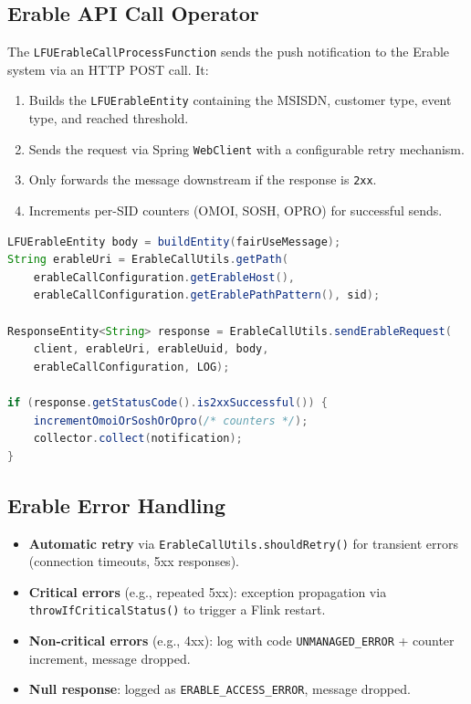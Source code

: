 \subsection{Erable API Call Operator}

The \texttt{LFUErableCallProcessFunction} sends the push notification to the Erable system via an HTTP POST call. It:
\begin{enumerate}
    \item Builds the \texttt{LFUErableEntity} containing the MSISDN, customer type, event type, and reached threshold.
    \item Sends the request via Spring \texttt{WebClient} with a configurable retry mechanism.
    \item Only forwards the message downstream if the response is \texttt{2xx}.
    \item Increments per-SID counters (OMOI, SOSH, OPRO) for successful sends.
\end{enumerate}

\begin{lstlisting}[language=Java, caption={HTTP call to Erable}]
LFUErableEntity body = buildEntity(fairUseMessage);
String erableUri = ErableCallUtils.getPath(
    erableCallConfiguration.getErableHost(),
    erableCallConfiguration.getErablePathPattern(), sid);

ResponseEntity<String> response = ErableCallUtils.sendErableRequest(
    client, erableUri, erableUuid, body,
    erableCallConfiguration, LOG);

if (response.getStatusCode().is2xxSuccessful()) {
    incrementOmoiOrSoshOrOpro(/* counters */);
    collector.collect(notification);
}
\end{lstlisting}

\subsection{Erable Error Handling}

\begin{itemize}
    \item \textbf{Automatic retry} via \texttt{ErableCallUtils.shouldRetry()} for transient errors (connection timeouts, 5xx responses).
    \item \textbf{Critical errors} (e.g., repeated 5xx): exception propagation via \texttt{throwIfCriticalStatus()} to trigger a Flink restart.
    \item \textbf{Non-critical errors} (e.g., 4xx): log with code \texttt{UNMANAGED\_ERROR} + counter increment, message dropped.
    \item \textbf{Null response}: logged as \texttt{ERABLE\_ACCESS\_ERROR}, message dropped.
\end{itemize}

